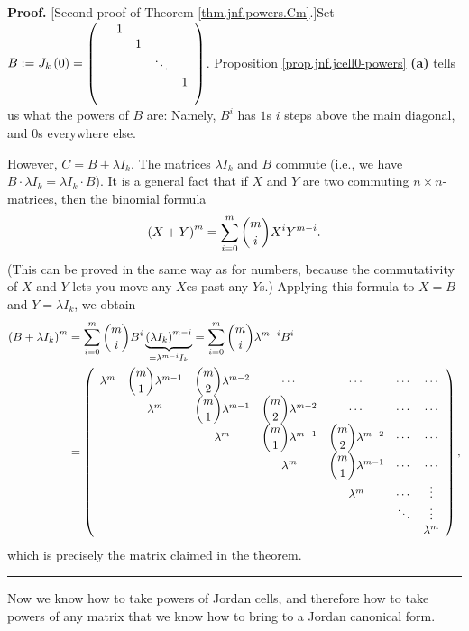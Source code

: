 \documentclass[numbers=enddot,12pt,final,onecolumn,notitlepage]{scrartcl}%
\numberwithin{exer}{subsection}
\theoremstyle{definition}
\newenvironment{proof}[1][Proof]{\noindent\textbf{#1.} }{\ \rule{0.5em}{0.5em}}
\let\sumnonlimits\sum
\renewcommand{\sum}{\sumnonlimits\limits}
\begin{document}
\begin{proof}
[Second proof of Theorem \ref{thm.jnf.powers.Cm}.]Set $B:=J_{k}\left(
0\right)  =\left(
\begin{array}
[c]{ccccc}
& 1 &  &  & \\
&  & 1 &  & \\
&  &  & \ddots & \\
&  &  &  & 1\\
&  &  &  &
\end{array}
\right)  $. Proposition \ref{prop.jnf.jcell0-powers} \textbf{(a)} tells us
what the powers of $B$ are: Namely, $B^{i}$ has $1$s $i$ steps above the main
diagonal, and $0$s everywhere else.

However, $C=B+\lambda I_{k}$. The matrices $\lambda I_{k}$ and $B$ commute
(i.e., we have $B\cdot\lambda I_{k}=\lambda I_{k}\cdot B$). It is a general
fact that if $X$ and $Y$ are two commuting $n\times n$-matrices, then the
binomial formula%
\[
\left(  X+Y\right)  ^{m}=\sum_{i=0}^{m}\dbinom{m}{i}X^{i}Y^{m-i}.
\]
(This can be proved in the same way as for numbers, because the commutativity
of $X$ and $Y$ lets you move any $X$es past any $Y$s.) Applying this formula
to $X=B$ and $Y=\lambda I_{k}$, we obtain%
\begin{align*}
\left(  B+\lambda I_{k}\right)  ^{m}  &  =\sum_{i=0}^{m}\dbinom{m}{i}%
B^{i}\underbrace{\left(  \lambda I_{k}\right)  ^{m-i}}_{=\lambda^{m-i}I_{k}%
}=\sum_{i=0}^{m}\dbinom{m}{i}\lambda^{m-i}B^{i}\\
&  =\left(
\begin{array}
[c]{ccccccc}%
\lambda^{m} & \dbinom{m}{1}\lambda^{m-1} & \dbinom{m}{2}\lambda^{m-2} & \cdots
& \cdots & \cdots & \cdots\\
& \lambda^{m} & \dbinom{m}{1}\lambda^{m-1} & \dbinom{m}{2}\lambda^{m-2} &
\cdots & \cdots & \cdots\\
&  & \lambda^{m} & \dbinom{m}{1}\lambda^{m-1} & \dbinom{m}{2}\lambda^{m-2} &
\cdots & \cdots\\
&  &  & \lambda^{m} & \dbinom{m}{1}\lambda^{m-1} & \cdots & \cdots\\
&  &  &  & \lambda^{m} & \cdots & \vdots\\
&  &  &  &  & \ddots & \vdots\\
&  &  &  &  &  & \lambda^{m}%
\end{array}
\right)  ,
\end{align*}
which is precisely the matrix claimed in the theorem.
\end{proof}

Now we know how to take powers of Jordan cells, and therefore how to take
powers of any matrix that we know how to bring to a Jordan canonical form.
\end{document}
